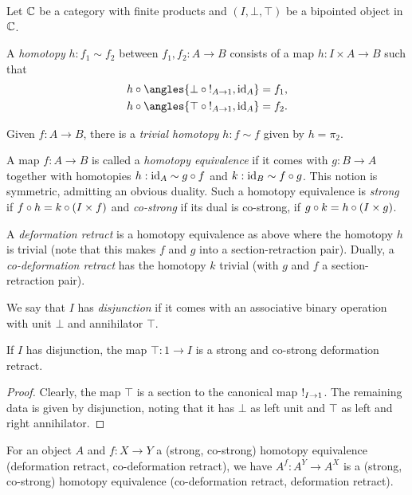 \documentclass[reqno,10pt,a4paper,oneside]{amsart}
\begin{document}
Let $\mathbb{C}$ be a category with finite products and $(I, \bot, \top)$ be a bipointed object in $\mathbb{C}$.

\begin{definition}
\label{def:homotopy}
A \emph{homotopy} $h : f_1 \sim f_2$ between $f_1, f_2 : A \to B$ consists of a map $h : I \times A \to B$ such that
\begin{align*}
h \cc \angles{\bot \cc \canonical_{A \to 1}, \id_A} &= f_1
,\\
h \cc \angles{\top \cc \canonical_{A \to 1}, \id_A} &= f_2
.\end{align*}

Given $f : A \to B$, there is a \emph{trivial homotopy} $h : f \sim f$ given by $h = \pi_2$. 
\end{definition}

\begin{definition}
\label{def:homotopy-equivalence}
A map $f : A \to B$ is called a \emph{homotopy equivalence} if it comes with $g : B \to A$ together with homotopies $h : \operatorname{id}_A \sim g \mathbin{\circ} f$ and $k : \operatorname{id}_B \sim f \mathbin{\circ} g$.
This notion is symmetric, admitting an obvious duality.
Such a homotopy equivalence is \emph{strong} if $f \mathbin{\circ} h = k \mathbin{\circ} (I \times f)$ and \emph{co-strong} if its dual is co-strong, \ie if $g \mathbin{\circ} k = h \mathbin{\circ} (I \times g)$.

A \emph{deformation retract} is a homotopy equivalence as above where the homotopy $h$ is trivial (note that this makes $f$ and $g$ into a section-retraction pair).
Dually, a \emph{co-deformation retract} has the homotopy $k$ trivial (with $g$ and $f$ a section-retraction pair).
\end{definition}

We say that $I$ has \emph{disjunction} if it comes with an associative binary operation with unit $\bot$ and annihilator $\top$.

\begin{example}
\label{disjunction-deformation-retract}
If $I$ has disjunction, the map $\top : 1 \to I$ is a strong and co-strong deformation retract.
\end{example}

\begin{proof}
Clearly, the map $\top$ is a section to the canonical map $\mathord{!}_{I \to 1}$.
The remaining data is given by disjunction, noting that it has $\bot$ as left unit and $\top$ as left and right annihilator.
\end{proof}

\begin{remark}
\label{h-equiv-exponent}
For an object $A$ and $f : X \to Y$ a (strong, co-strong) homotopy equivalence (deformation retract, co-deformation retract), we have $A^f : A^Y \to A^X$ is a (strong, co-strong) homotopy equivalence (co-deformation retract, deformation retract).
\end{remark}
\end{document}
